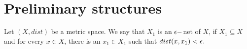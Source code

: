 \documentclass[final, 12pt]{colt2018} %
\begin{document}

\section{Preliminary structures}
\begin{definition}
Let $(X, dist)$ be a metric space. We say that $X_1$ is an ${\epsilon}-$net of $X$, if $X_1 \subseteq X$ and for every $x \in X$, there is an $x_1 \in X_1$ such that $dist(x, x_1) < {\epsilon}.$
\end{definition}
\end{document}
